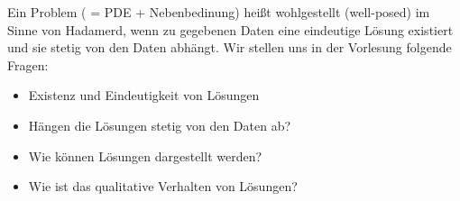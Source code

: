 \begin{bemerkung}
	Ein Problem ( = PDE + Nebenbedinung) heißt wohlgestellt (well-posed) im Sinne von Hadamerd, wenn zu gegebenen Daten eine eindeutige Lösung existiert und sie stetig von den Daten abhängt.
	Wir stellen uns in der Vorlesung folgende Fragen:
	\begin{itemize}
		\item Existenz und Eindeutigkeit von Lösungen
		\item Hängen die Lösungen stetig von den Daten ab?
		\item Wie können Lösungen dargestellt werden?
		\item Wie ist das qualitative Verhalten von Lösungen?
	\end{itemize}
\end{bemerkung}

